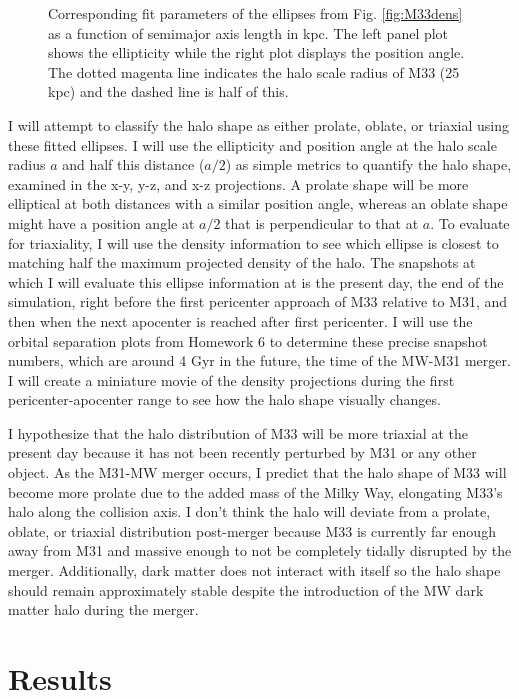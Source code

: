 \documentclass[twocolumn, linenumbers,trackchanges]{aastex7}
\begin{document}
\begin{figure}[ht!]
\caption{Corresponding fit parameters of the ellipses from Fig. \ref{fig:M33dens}  as a function of semimajor axis length in kpc. The left panel plot shows the ellipticity while the right plot displays the position angle. The dotted magenta line indicates the halo scale radius of M33 (25 kpc) and the dashed line is half of this. 
\label{fig:EllipseParams}}
\end{figure}

I will attempt to classify the halo shape as either prolate, oblate, or triaxial using these fitted ellipses. I will use the ellipticity and position angle at the halo scale radius $a$ and half this distance ($a/2$) as simple metrics to quantify the halo shape, examined in the x-y, y-z, and x-z projections. A prolate shape will be more elliptical at both distances with a similar position angle, whereas an oblate shape might have a position angle at $a/2$ that is perpendicular to that at $a$. To evaluate for triaxiality, I will use the density information to see which ellipse is closest to matching half the maximum projected density of the halo. The snapshots at which I will evaluate this ellipse information at is the present day, the end of the simulation, right before the first pericenter approach of M33 relative to M31, and then when the next apocenter is reached after first pericenter. I will use the orbital separation plots from Homework 6 to determine these precise snapshot numbers, which are around 4 Gyr in the future, the time of the MW-M31 merger. I will create a miniature movie of the density projections during the first pericenter-apocenter range to see how the halo shape visually changes. 

I hypothesize that the halo distribution of M33 will be more triaxial at the present day because it has not been recently perturbed by M31 or any other object. As the M31-MW merger occurs, I predict that the halo shape of M33 will become more prolate due to the added mass of the Milky Way, elongating M33's halo along the collision axis. I don't think the halo will deviate from a prolate, oblate, or triaxial distribution post-merger because M33 is currently far enough away from M31 and massive enough to not be completely tidally disrupted by the merger. Additionally, dark matter does not interact with itself so the halo shape should remain approximately stable despite the introduction of the MW dark matter halo during the merger. 

\section{Results}
\end{document}
